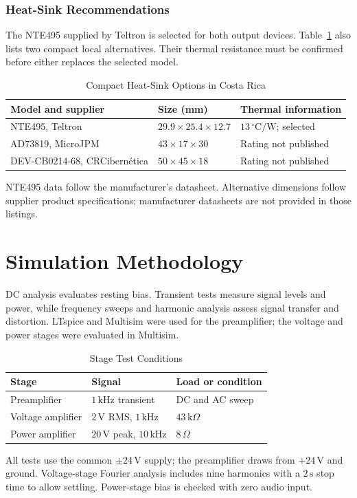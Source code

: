 \documentclass[conference,letterpaper]{IEEEtran}
\newcommand{\Ohm}{\Omega}
\newcommand{\kohm}{\mathrm{k}\Omega}
\newcommand{\V}{\mathrm{V}}
\newcommand{\kHz}{\mathrm{kHz}}
\begin{document}
\subsubsection{Heat-Sink Recommendations}
The NTE495 supplied by Teltron is selected for both output devices.
Table~\ref{tab:heatsink_options} also lists two compact local
alternatives. Their thermal resistance must be confirmed before
either replaces the selected model.
\begin{table}[H]
\caption{Compact Heat-Sink Options in Costa Rica}
\label{tab:heatsink_options}
\centering\footnotesize
\setlength{\tabcolsep}{2pt}
\begin{tabular}{@{}p{}p{}p{}@{}}
\toprule
Model and supplier & Size (mm) & Thermal information\\
\midrule
NTE495, Teltron & $29.9\times25.4\times12.7$ & $13\,{}^\circ\mathrm{C/W}$; selected \cite{nte495}\\
AD73819, MicroJPM & $43\times17\times30$ & Rating not published \cite{microjpm_heatsink}\\
DEV-CB0214-68, CRCibern\'etica & $50\times45\times18$ & Rating not published \cite{crc_heatsink}\\
\bottomrule
\end{tabular}
\par\smallskip
\parbox{.97\columnwidth}{\scriptsize NTE495 data follow the manufacturer's datasheet. Alternative dimensions follow supplier product specifications; manufacturer datasheets are not provided in those listings.}
\end{table}
\FloatBarrier

\section{Simulation Methodology}
DC analysis evaluates resting bias. Transient tests measure signal
levels and power, while frequency sweeps and harmonic analysis assess
signal transfer and distortion. LTspice and Multisim were used for the
preamplifier; the voltage and power stages were evaluated in Multisim.
\begin{table}[H]
\caption{Stage Test Conditions}
\label{tab:test_conditions}
\centering\footnotesize
\setlength{\tabcolsep}{2pt}
\begin{tabular}{@{}p{}p{}p{}@{}}
\toprule
Stage & Signal & Load or condition\\
\midrule
Preamplifier & $1\,\kHz$ transient & DC and AC sweep\\
Voltage amplifier & $2\,\V$ RMS, $1\,\kHz$ & $43\,\kohm$\\
Power amplifier & $20\,\V$ peak, $10\,\kHz$ & $8\,\Ohm$\\
\bottomrule
\end{tabular}
\par\smallskip
\parbox{.97\columnwidth}{\scriptsize All tests use the common $\pm24\,\V$ supply; the preamplifier draws from $+24\,\V$ and ground. Voltage-stage Fourier analysis includes nine harmonics with a $2\,\mathrm{s}$ stop time to allow settling. Power-stage bias is checked with zero audio input.}
\end{table}
\FloatBarrier
\end{document}
